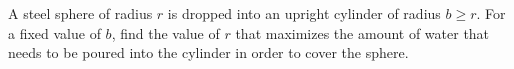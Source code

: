 A steel sphere of radius $r$ is dropped into an upright cylinder of
radius $b \ge r$. For a fixed value of $b$, find the
value of $r$ that maximizes the amount of water that
needs to be poured into the cylinder in order to cover
the sphere.\answercheck
